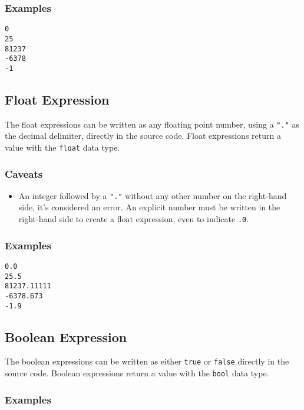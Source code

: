 \subsubsection{Examples}

\begin{lstlisting}
0
25
81237
-6378
-1
\end{lstlisting}

\subsection{Float Expression}

The float expressions can be written as any floating point number, using a \texttt{"."} as the decimal delimiter, directly in the source code.
Float expressions return a value with the \texttt{float} data type.

\subsubsection{Caveats}

\begin{itemize}
    \item An integer followed by a \texttt{"."} without any other number on the right-hand side, it's considered an error. An explicit number
        must be written in the right-hand side to create a float expression, even to indicate \texttt{.0}.
\end{itemize}

\subsubsection{Examples}

\begin{lstlisting}
0.0
25.5
81237.11111
-6378.673
-1.9
\end{lstlisting}

\subsection{Boolean Expression}

The boolean expressions can be written as either \texttt{true} or \texttt{false} directly in the source code.
Boolean expressions return a value with the \texttt{bool} data type.

\subsubsection{Examples}

